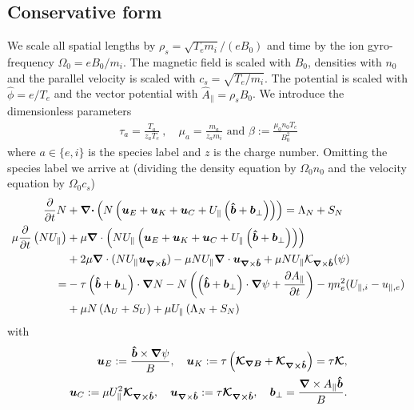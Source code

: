 \subsection{Conservative form}
We scale all spatial lengths by $\rho_s = \sqrt{T_e m_i}/(eB_0)$ and time by the ion gyro-frequency $\Omega_0 = eB_0/m_i$.
The magnetic field is scaled with $B_0$, densities with $n_0$ and the parallel velocity is scaled with $c_s = \sqrt{T_e/m_i}$.
The potential is scaled with $\hat \phi = e/T_e$ and the vector potential with
$\hat A_\parallel = \rho_s B_0$.
We introduce the dimensionless parameters
\begin{align}
  \tau_a = \frac{T_a}{z_aT_e}~,\quad \mu_a = \frac{m_a}{z_am_i}\text{ and }
  \beta:=\frac{\mu_0 n_0 T_e}{B_0^2}
  \label{}
\end{align}
where $a\in\{e,i\}$ is the species label and $z$ is the charge number.
Omitting the species label we arrive at (dividing the density equation by $\Omega_0n_0$ and the velocity equation by $\Omega_0 c_s$)
\begin{align}
\frac{\partial}{\partial t} N &+ {\boldsymbol{{\boldsymbol{\nabla}}\cdot}}\left( N \left(
    {\boldsymbol{u}}_E + {\boldsymbol{u}}_K + {\boldsymbol{u}}_{C} + U_\parallel\left(\bm{\hat{b}} + {{\boldsymbol{b}}}_\perp\right)\right)\right) = \Lambda_N + S_N \\
    \mu \frac{\partial}{\partial t} \left(N U_\parallel\right) &+ \mu {\boldsymbol{\nabla}}\cdot \left( NU_\parallel \left(
    {\boldsymbol{u}}_E + {\boldsymbol{u}}_K + {\boldsymbol{u}}_{C} + U_\parallel\left(\bm{\hat{b}} + {{\boldsymbol{b}}}_\perp\right)
    \right)\right)  \nonumber \\
    &+ 2\mu {\boldsymbol{\nabla}}\cdot ( NU_\parallel {\boldsymbol{u}}_{{\boldsymbol{\nabla}}\times\bm{\hat{b}}})
    -\mu NU_\parallel{\boldsymbol{\nabla}}\cdot {\boldsymbol{u}}_{{\boldsymbol{\nabla}}\times\bm{\hat{b}}}
    + \mu NU_\parallel\mathcal K_{{\boldsymbol{\nabla}}\times\bm{\hat{b}}}(\psi) \nonumber\\
    =& -\tau \left(\bm{\hat{b}} + {{\boldsymbol{b}}}_\perp\right)\cdot{\boldsymbol{\nabla}} N
    -N \left( \left(\bm{\hat{b}}+{{\boldsymbol{b}}}_\perp\right)\cdot{\boldsymbol{\nabla}} \psi + \frac{\partial A_\parallel}{\partial t}\right)
    - \eta n_e^2(U_{\parallel,i}-u_{\parallel,e})
    \nonumber\\
    &+ \mu N\left(\Lambda_U + S_U\right) + \mu U_\parallel \left(\Lambda_N + S_N\right)
\label{}
\end{align}
with
\begin{align}
{\boldsymbol{u}}_E := \frac{\bm{\hat{b}}\times{\boldsymbol{\nabla}}\psi}{B},\quad
{\boldsymbol{u}}_{K} := \tau \left({\boldsymbol{\mathcal K_{{\boldsymbol{\nabla}} B}}} + {\boldsymbol{\mathcal K_{{\boldsymbol{\nabla}}\times\bm{\hat{b}}}}}\right)=\tau{\boldsymbol{\mathcal K}}  ,\nonumber\\
{\boldsymbol{u}}_C := \mu U_\parallel^2{\boldsymbol{\mathcal K_{{\boldsymbol{\nabla}}\times\bm{\hat{b}}}}},\quad
{\boldsymbol{u}}_{{\boldsymbol{\nabla}}\times\bm{\hat{b}}} := \tau{\boldsymbol{\mathcal K_{{\boldsymbol{\nabla}}\times\bm{\hat{b}}}}},\quad
{{\boldsymbol{b}}}_\perp = \frac{{\boldsymbol{\nabla}}\times A_\parallel \bm{\hat{b}}}{B}.
\label{}
\end{align}

